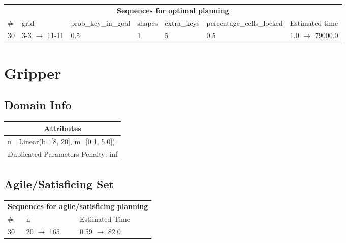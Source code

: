 \documentclass{article}
\begin{document}
                            \begin{center}
                            \begin{tabular}{l|l|l|l|l|l|l}
                            \multicolumn{7}{c}{\bf \large Sequences for optimal planning}\\
                            \# & grid & prob\_key\_in\_goal & shapes & extra\_keys & percentage\_cells\_locked & Estimated time\\\midrule
                            30&3-3 $\rightarrow$ 11-11&0.5&1&5&0.5&1.0 $\rightarrow$ 79000.0
                            \end{tabular}
                            \end{center}
                    \newpage \section{Gripper}
                    \subsection*{Domain Info}

                    \begin{center}
                    \begin{tabular}{p{}p{}}
                    \multicolumn{2}{c}{\bf \large Attributes}\\\midrule
                    n & Linear(b=[8, 20], m=[0.1, 5.0])
                    
                     \\\midrule
                    \multicolumn{2}{l}{Duplicated Parameters Penalty: inf}
                    \end{tabular}
                    \end{center}
                
                         \subsection*{Agile/Satisficing Set}

                        \begin{center}
                        \begin{tabular}{l|l|l}
                        \multicolumn{3}{c}{\bf \large Sequences for agile/satisficing planning}\\
                        \# & n & Estimated Time\\\midrule
                        30&20 $\rightarrow$ 165&0.59 $\rightarrow$ 82.0
                        \end{tabular}
                        \end{center}
                    
\end{document}
